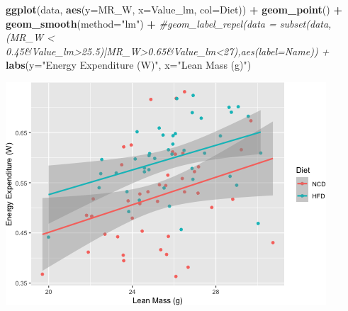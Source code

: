 \documentclass[]{article}
\newenvironment{Shaded}{\begin{snugshade}}{\end{snugshade}}
\newcommand{\CommentTok}[1]{\textcolor[rgb]{0.56,0.35,0.01}{\textit{#1}}}
\newcommand{\DataTypeTok}[1]{\textcolor[rgb]{0.13,0.29,0.53}{#1}}
\newcommand{\KeywordTok}[1]{\textcolor[rgb]{0.13,0.29,0.53}{\textbf{#1}}}
\newcommand{\NormalTok}[1]{#1}
\newcommand{\OperatorTok}[1]{\textcolor[rgb]{0.81,0.36,0.00}{\textbf{#1}}}
\newcommand{\StringTok}[1]{\textcolor[rgb]{0.31,0.60,0.02}{#1}}
\begin{document}
\begin{Shaded}
\begin{Highlighting}[]
\KeywordTok{ggplot}\NormalTok{(data, }\KeywordTok{aes}\NormalTok{(}\DataTypeTok{y=}\NormalTok{MR_W,}
           \DataTypeTok{x=}\NormalTok{Value_lm,}
           \DataTypeTok{col=}\NormalTok{Diet)) }\OperatorTok{+}
\StringTok{  }\KeywordTok{geom_point}\NormalTok{() }\OperatorTok{+}
\StringTok{  }\KeywordTok{geom_smooth}\NormalTok{(}\DataTypeTok{method=}\StringTok{"lm"}\NormalTok{) }\OperatorTok{+}
\StringTok{  }\CommentTok{#geom_label_repel(data = subset(data, (MR_W < 0.45&Value_lm>25.5)|MR_W>0.65&Value_lm<27),aes(label=Name)) +}
\StringTok{  }\KeywordTok{labs}\NormalTok{(}\DataTypeTok{y=}\StringTok{"Energy Expenditure (W)"}\NormalTok{,}
       \DataTypeTok{x=}\StringTok{"Lean Mass (g)"}\NormalTok{)}
\end{Highlighting}
\end{Shaded}

\includegraphics{figures/lean-mass-adjusting-2.png}
\end{document}
